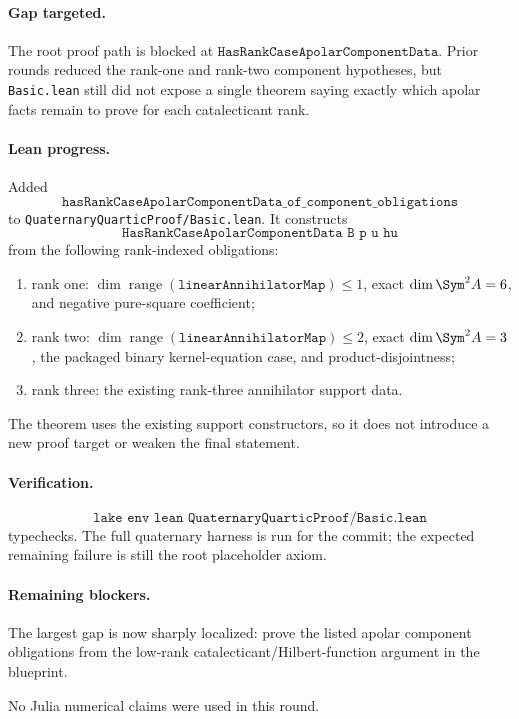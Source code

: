 \documentclass[11pt]{article}
\begin{document}
\paragraph{Gap targeted.}
The root proof path is blocked at
\(\texttt{HasRankCaseApolarComponentData}\).  Prior rounds reduced the
rank-one and rank-two component hypotheses, but \texttt{Basic.lean} still did
not expose a single theorem saying exactly which apolar facts remain to prove
for each catalecticant rank.

\paragraph{Lean progress.}
Added
\[
\texttt{hasRankCaseApolarComponentData\_of\_component\_obligations}
\]
to \texttt{QuaternaryQuarticProof/Basic.lean}.  It constructs
\[
\texttt{HasRankCaseApolarComponentData B p u hu}
\]
from the following rank-indexed obligations:
\begin{enumerate}
\item rank one: \(\dim\operatorname{range}(\texttt{linearAnnihilatorMap})\le1\),
  exact \(\dim\Sym^2A=6\), and negative pure-square coefficient;
\item rank two: \(\dim\operatorname{range}(\texttt{linearAnnihilatorMap})\le2\),
  exact \(\dim\Sym^2A=3\), the packaged binary kernel-equation case, and
  product-disjointness;
\item rank three: the existing rank-three annihilator support data.
\end{enumerate}
The theorem uses the existing support constructors, so it does not introduce a
new proof target or weaken the final statement.

\paragraph{Verification.}
\[
\texttt{lake env lean QuaternaryQuarticProof/Basic.lean}
\]
typechecks.  The full quaternary harness is run for the commit; the expected
remaining failure is still the root placeholder axiom.

\paragraph{Remaining blockers.}
The largest gap is now sharply localized: prove the listed apolar component
obligations from the low-rank catalecticant/Hilbert-function argument in the
blueprint.

No Julia numerical claims were used in this round.
\end{document}
